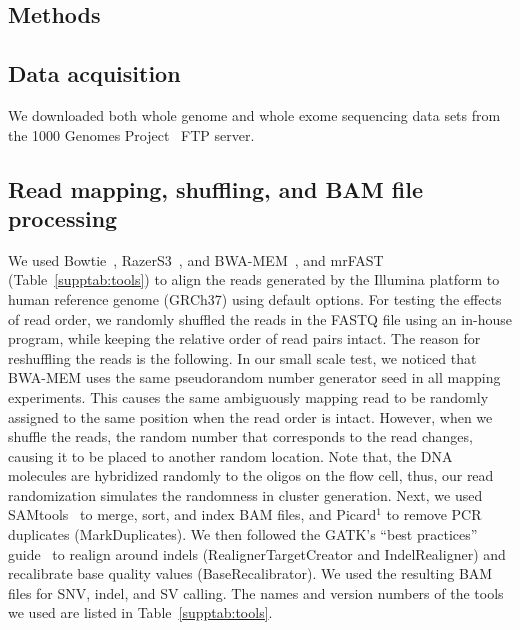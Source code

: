 \documentclass{bioinfo}
\begin{document}
\vspace*{-0.75cm}
\begin{methods}
\section{Methods}

\subsection*{Data acquisition}

We downloaded both whole genome and whole exome sequencing data sets from the 1000 Genomes Project~\citep{1000GP2015} 
FTP server.%

\vspace*{-0.3cm}
\subsection*{Read mapping, shuffling, and BAM file processing}
We used  Bowtie~\citep{Langmead2009}, RazerS3~\citep{Weese2012}, and BWA-MEM~\citep{Li2013}, and mrFAST~\citep{Alkan2009} 
(Table~\ref{supptab:tools}) 
to align the reads generated by the Illumina 
platform to human reference genome (GRCh37) using default options. For testing the effects of read order, we randomly 
shuffled the reads in the FASTQ file using an in-house program, while keeping the relative order of read pairs intact.
The reason for reshuffling the reads is the following. In our small scale test, we noticed that BWA-MEM uses the same pseudorandom number generator seed in all mapping experiments. This
causes the same ambiguously mapping read to be randomly assigned to the same position when the read order is intact. However, when we shuffle the reads, the random number that corresponds to 
the read changes, causing it to be placed to another random location. Note that, the DNA molecules are hybridized randomly to the oligos on the flow cell, thus, our read randomization simulates the randomness
in cluster generation.
Next, we used SAMtools~\citep{Li2009b} to merge, sort, and index BAM files, and Picard$^1$ to remove PCR duplicates (MarkDuplicates).
We then followed the GATK's ``best practices'' guide~\citep{VanderAuwera2013} to
realign around indels (RealignerTargetCreator and IndelRealigner) and recalibrate base quality values (BaseRecalibrator). We used the 
resulting BAM files for SNV, indel, and SV calling. The names and version numbers of the tools we used are listed in  Table~\ref{supptab:tools}.


\end{methods}
\end{document}
